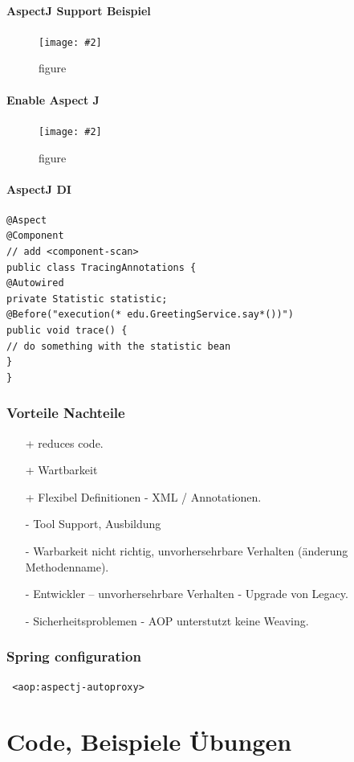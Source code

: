 \documentclass[a4paper,10pt]{scrreprt}
\newcommand{\pic}[2][figure]{\begin{figure}[h]
 \centering
 \texttt{[image: \#2]}
 \caption{#1}
\end{figure}
}
\begin{document}
\subsection{AspectJ Support Beispiel}
\pic{ajs.png}

\subsection{Enable Aspect J}
\pic{enajs.png}
\subsection{AspectJ DI}
\begin{lstlisting}[caption=Aspect J Depedency Injection]
 @Aspect
@Component
// add <component-scan>
public class TracingAnnotations {
@Autowired
private Statistic statistic;
@Before("execution(* edu.GreetingService.say*())")
public void trace() {
// do something with the statistic bean
}
}
\end{lstlisting}

\section{Vorteile Nachteile}
\begin{itemize}
 \item [+] reduces code.
 \item [+] Wartbarkeit
 \item[+] Flexibel Definitionen - XML / Annotationen.
 \item[-] Tool Support, Ausbildung
 \item [-] Warbarkeit nicht richtig, unvorhersehrbare Verhalten (änderung Methodenname).
 \item [-] Entwickler -- unvorhersehrbare Verhalten - Upgrade von Legacy.
 \item [-] Sicherheitsproblemen - AOP unterstutzt keine Weaving.
\end{itemize}

\section{Spring configuration}
\begin{verbatim}
 <aop:aspectj-autoproxy>
\end{verbatim}



\part{Code, Beispiele Übungen}
\end{document}

